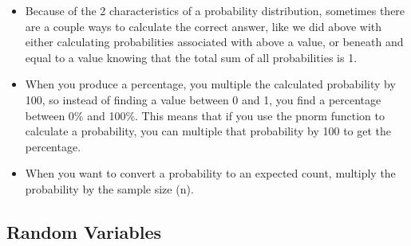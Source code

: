 \documentclass[
  letterpaper,
  DIV=11,
  numbers=noendperiod]{scrreprt}
\providecommand{\tightlist}{%
  \setlength{\itemsep}{0pt}\setlength{\parskip}{0pt}}\usepackage{longtable,booktabs,array}
\begin{document}
\begin{itemize}
  \begin{itemize}
  \tightlist
  \item
    \(P(X>=2) = P(X=2)+P(X=3)+P(X=4)  = .166+.165+.546= .877\)
  \item
    Or \(1-P(X<2) = 1-.123 = .877\)
  \end{itemize}
\item
  Because of the 2 characteristics of a probability distribution,
  sometimes there are a couple ways to calculate the correct answer,
  like we did above with either calculating probabilities associated
  with above a value, or beneath and equal to a value knowing that the
  total sum of all probabilities is 1.
\item
  When you produce a percentage, you multiple the calculated probability
  by 100, so instead of finding a value between 0 and 1, you find a
  percentage between 0\% and 100\%. This means that if you use the pnorm
  function to calculate a probability, you can multiple that probability
  by 100 to get the percentage.
\item
  When you want to convert a probability to an expected count, multiply
  the probability by the sample size (n).
\end{itemize}

\subsection{Random Variables}\label{random-variables}
\end{document}
